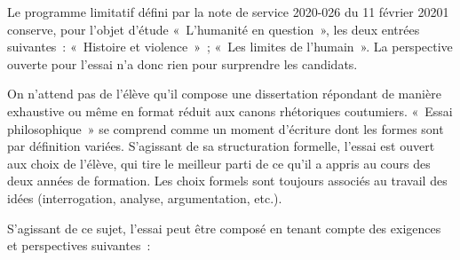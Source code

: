 {Le programme limitatif défini par la note de service 2020-026 du 11 février 20201
conserve, pour l'objet d'étude «~L'humanité en question~», les deux entrées suivantes~:
«~Histoire et violence~»~; «~Les limites de l'humain~». La perspective ouverte pour l'essai
n'a donc rien pour surprendre les candidats.

On n'attend pas de l'élève qu'il compose une dissertation répondant de manière
exhaustive ou même en format réduit aux canons rhétoriques coutumiers.
«~Essai philosophique~» se comprend comme un moment d'écriture dont les formes
sont par définition variées. S'agissant de sa structuration formelle, l'essai est ouvert
aux choix de l'élève, qui tire le meilleur parti de ce qu'il a appris au cours des deux
années de formation. Les choix formels sont toujours associés au travail des idées
(interrogation, analyse, argumentation, etc.).

S'agissant de ce sujet, l'essai peut être composé en tenant compte des exigences et
perspectives suivantes~:

}
